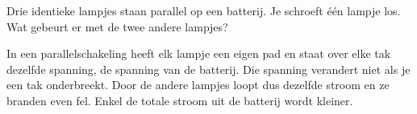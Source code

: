 \documentclass{ximera}
\begin{document}
\begin{question}
    Drie identieke lampjes staan parallel op een batterij. Je schroeft één lampje los. Wat gebeurt er met de twee andere lampjes?

    \begin{multipleChoice}
    \end{multipleChoice}

    \begin{solution}\nl
        In een parallelschakeling heeft elk lampje een eigen pad en staat over elke tak dezelfde spanning, de spanning van de batterij. Die spanning verandert niet als je een tak onderbreekt. Door de andere lampjes loopt dus dezelfde stroom en ze branden even fel. Enkel de totale stroom uit de batterij wordt kleiner.
    \end{solution}
\end{question}
\end{document}

